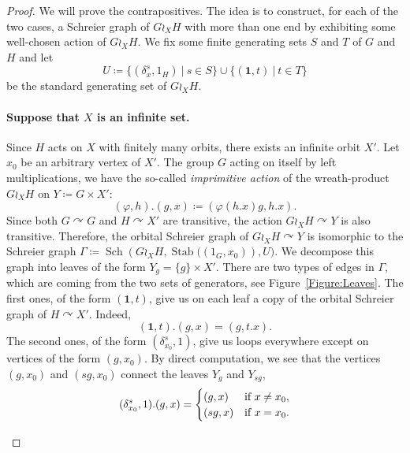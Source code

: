 \documentclass[a4paper]{article}
\theoremstyle{definition}
\theoremstyle{remark}%
\DeclareMathOperator\Sch{Sch}
\DeclareMathOperator\stab{Stab}
\newcommand{\setst}[2]{\{#1\ |\ #2\}}
\begin{document}
\begin{proof}
We will prove the contrapositives. The idea is to construct, for each of the two cases, a Schreier graph of $G\wr_XH$ with more than one end by exhibiting some well-chosen action of $G\wr_XH$.
We fix some finite generating sets $S$ and $T$ of $G$ and $H$ and let 
\[
	U\coloneqq\setst{(\delta_x^s,1_H)}{s \in S} \cup \setst{(\mathbf 1,t)}{t \in T}
\]
be the standard generating set of $G\wr_XH$.
%
%
%
\paragraph{Suppose that $X$ is an infinite set.}
Since $H$ acts on $X$ with finitely many orbits, there exists an infinite orbit $X'$.
Let $x_0$ be an arbitrary vertex of $X'$.
The group $G$ acting on itself by left multiplications, we have the so-called \emph{imprimitive action} of the wreath-product $G\wr_XH$ on $Y\coloneqq G\times X'$:
\[
	(\varphi,h). (g,x) \coloneqq (\varphi(h.x)g, h.x).
\]
Since both $G\curvearrowright G$ and $H\curvearrowright X'$ are transitive, the action $G\wr_XH\curvearrowright Y$ is also transitive. 
Therefore, the orbital Schreier graph of $G\wr_XH\curvearrowright Y$ is isomorphic to the Schreier graph $\Gamma\coloneqq\Sch\left(G\wr_XH, \stab((1_G,x_0)\right), U)$. We decompose this graph into leaves of the form $Y_g = \{ g \} \times X'$. There are two types of edges in $\Gamma$, which are coming from the two sets of generators, see Figure~\ref{Figure:Leaves}. The first ones, of the form $(\mathbf 1,t)$, give us on each leaf a copy of the orbital Schreier graph of $H \curvearrowright X'$. Indeed,
\[
	(\mathbf 1,t).(g,x) = (g, t.x).
\]
The second ones, of the form $(\delta_{x_0}^s,1)$, give us loops everywhere except on vertices of the form $(g,x_0)$. By direct computation, we see that the vertices $(g,x_0)$ and $(sg,x_0)$ connect the leaves $Y_g$ and $Y_{sg}$, 
\[
	(\delta_{x_0}^s,1).(g,x) = 
		\begin{cases}
		(g,x) & \textnormal{if }x \neq x_0, \\
		(sg, x) & \textnormal{if }x = x_0.
		\end{cases}
\]
%
%
\begin{figure}[htbp]\centering
{}

\end{figure}
\end{proof}
\end{document}
